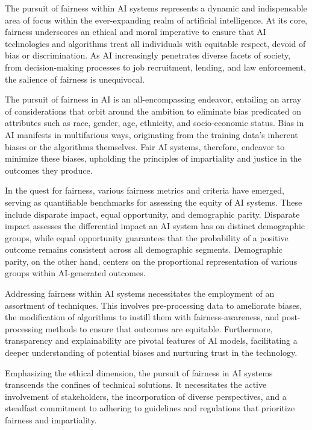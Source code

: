 \documentclass[12pt,a4paper,openright,twoside]{book}
\begin{document}
The pursuit of fairness within AI systems represents a dynamic and indispensable area of focus within the ever-expanding realm of artificial intelligence. At its core, fairness underscores an ethical and moral imperative to ensure that AI technologies and algorithms treat all individuals with equitable respect, devoid of bias or discrimination. As AI increasingly penetrates diverse facets of society, from decision-making processes to job recruitment, lending, and law enforcement, the salience of fairness is unequivocal. 

The pursuit of fairness in AI is an all-encompassing endeavor, entailing an array of considerations that orbit around the ambition to eliminate bias predicated on attributes such as race, gender, age, ethnicity, and socio-economic status. Bias in AI manifests in multifarious ways, originating from the training data's inherent biases or the algorithms themselves. Fair AI systems, therefore, endeavor to minimize these biases, upholding the principles of impartiality and justice in the outcomes they produce. 

In the quest for fairness, various fairness metrics and criteria have emerged, serving as quantifiable benchmarks for assessing the equity of AI systems. These include disparate impact, equal opportunity, and demographic parity. Disparate impact assesses the differential impact an AI system has on distinct demographic groups, while equal opportunity guarantees that the probability of a positive outcome remains consistent across all demographic segments. Demographic parity, on the other hand, centers on the proportional representation of various groups within AI-generated outcomes. 

Addressing fairness within AI systems necessitates the employment of an assortment of techniques. This involves pre-processing data to ameliorate biases, the modification of algorithms to instill them with fairness-awareness, and post-processing methods to ensure that outcomes are equitable. Furthermore, transparency and explainability are pivotal features of AI models, facilitating a deeper understanding of potential biases and nurturing trust in the technology. 

Emphasizing the ethical dimension, the pursuit of fairness in AI systems transcends the confines of technical solutions. It necessitates the active involvement of stakeholders, the incorporation of diverse perspectives, and a steadfast commitment to adhering to guidelines and regulations that prioritize fairness and impartiality. 
\end{document}
